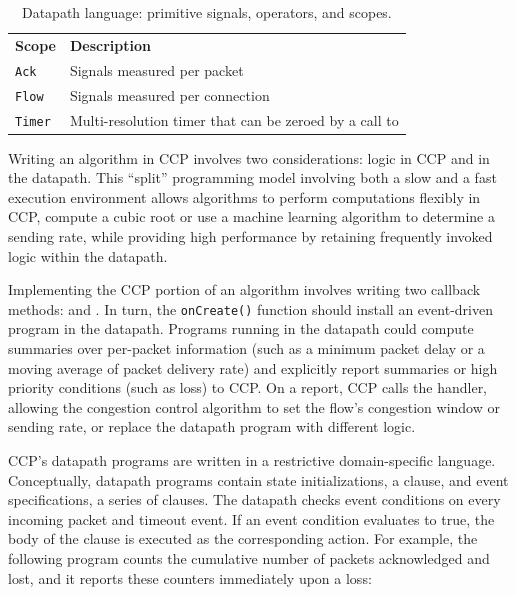 \begin{table}
\begin{tabular}{p{}p{}}
        \hline
        \textbf{Scope} & \textbf{Description} \\
        \texttt{Ack} & Signals measured per packet \\
        \texttt{Flow} & Signals measured per connection \\
        \texttt{Timer} & Multi-resolution timer that can be zeroed by a call to \ct{reset} \\
    \end{tabular}
    \caption{Datapath language: primitive signals, operators, and scopes.}\label{tab:api}
\end{table}

Writing an algorithm in CCP involves two considerations: logic in CCP and in the datapath.
This ``split'' programming model involving both a slow and a fast execution environment allows
algorithms to perform computations flexibly in CCP, \eg compute a cubic
root or use a machine learning algorithm to determine a sending rate, while
providing high performance by retaining frequently invoked logic within
the datapath.

Implementing the CCP portion of an algorithm involves writing two callback methods:
 and .
In turn, the \texttt{onCreate()} function should install an
event-driven program in the datapath.
Programs running in the datapath could compute summaries over per-packet
information (such as a minimum packet delay or a moving average of packet
delivery rate) and explicitly report summaries or high priority conditions
(such as loss) to CCP.
On a report, CCP calls the  handler,
allowing the congestion control algorithm to set the flow's congestion
window or sending rate, or replace the datapath program with different logic.

 CCP's datapath programs are written in a restrictive
domain-specific language.
Conceptually, datapath programs contain state initializations, \ie a 
clause, and event specifications, \ie a series of  clauses.
The datapath checks event conditions on every incoming packet and timeout event.
If an event condition evaluates to true, the body of the  clause is executed as the corresponding
action.
For example, the following program counts the cumulative
number of packets acknowledged and lost, and it reports these counters immediately upon a loss:

